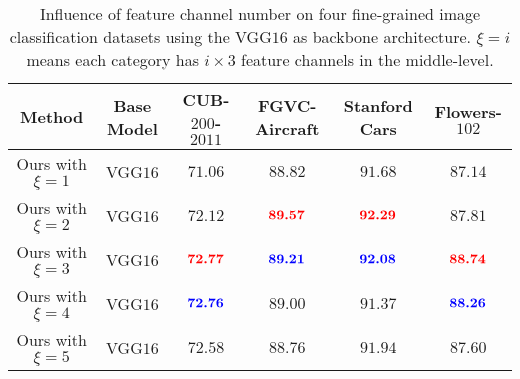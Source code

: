 \documentclass[journal]{IEEEtran}
\def\tblue#1{\textcolor[rgb]{0,0,1}{#1}} %
\def\tred#1{\textcolor[rgb]{1,0,0}{#1}}  %
\begin{document}
\begin{table*}[!t]
  \centering
  \small
  \caption{Influence of feature channel number on four fine-grained image classification datasets using the VGG$16$ as backbone architecture. $\xi =i$ means each category has $i \times 3$ feature channels in the middle-level.}
  \begin{adjustbox}{width=0.8\linewidth,center}
   \Huge   %
    \begin{tabular}{|c|c|c|c|c|c|}
    \toprule
    Method     & Base Model             & CUB-$200$-$2011$   & FGVC-Aircraft      & Stanford Cars     & Flowers-$102$ \\
    \midrule
    \midrule
    Ours with $\xi =1$ & VGG$16$ & $71.06$        & $88.82$        & $91.68$        & $87.14$ \\
    Ours with $\xi =2$ & VGG$16$ & $72.12$        & $\textbf{\tred{89.57}}$ & $\textbf{\tred{92.29}}$ & $87.81$ \\
    Ours with $\xi =3$ & VGG$16$ & $\textbf{\tred{72.77}}$ & $\textbf{\tblue{89.21}}$& $\textbf{\tblue{92.08}}$& $\textbf{\tred{88.74}}$ \\
    Ours with $\xi =4$ & VGG$16$ & $\textbf{\tblue{72.76}}$& $89.00$        & $91.37$        & $\textbf{\tblue{88.26}}$ \\
    Ours with $\xi =5$ & VGG$16$ & $72.58$        & $88.76$        & $91.94$        & $87.60$ \\


    
    \bottomrule
    \end{tabular}%
  \end{adjustbox}
  \label{tab:ablation_2}%
\end{table*}%
\end{document}
